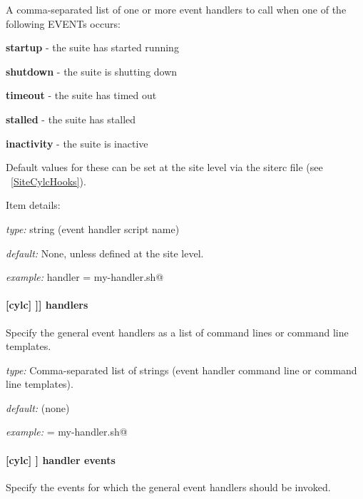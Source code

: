 A comma-separated list of one or more event handlers to call when one of the
following EVENTs occurs:
\begin{myitemize}
    \item {\bf startup}  - the suite has started running
    \item {\bf shutdown} - the suite is shutting down
    \item {\bf timeout}  - the suite has timed out
    \item {\bf stalled} - the suite has stalled
    \item {\bf inactivity} - the suite is inactive
\end{myitemize}

Default values for these can be set at the site level via the siterc file
(see ~\ref{SiteCylcHooks}).

Item details:
\begin{myitemize}
    \item {\em type:} string (event handler script name)
    \item {\em default:} None, unless defined at the site level.
    \item {\em example:} \lstinline@startup handler = my-handler.sh@
\end{myitemize}

\paragraph[handlers]{[cylc] \textrightarrow [[[events]]] \textrightarrow handlers}

Specify the general event handlers as a list of command lines or command line
templates.

\begin{myitemize}
    \item {\em type:} Comma-separated list of strings (event handler command line or command line templates).
    \item {\em default:} (none)
    \item {\em example:} \lstinline@handlers = my-handler.sh@
\end{myitemize}

\paragraph[handler events]{[cylc] \textrightarrow [[events]] \textrightarrow handler events}

Specify the events for which the general event handlers should be invoked.

